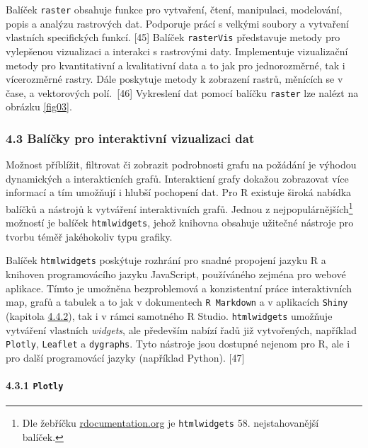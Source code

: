 \documentclass[12pt,]{article}
\let\oldparagraph\paragraph
\renewcommand{\paragraph}[1]{\oldparagraph{#1}\mbox{}}
\let\rmarkdownfootnote\footnote%
\def\footnote{\protect\rmarkdownfootnote}
\begin{document}
\qquad Balíček \texttt{raster} obsahuje funkce pro vytvaření, čtení,
manipulaci, modelování, popis a analýzu rastrových dat. Podporuje prácí
s velkými soubory a vytvaření vlastních specifických funkcí. {[}45{]}
Balíček \texttt{rasterVis} představuje metody pro vylepšenou vizualizaci
a interakci s rastrovými daty. Implementuje vizualizační metody pro
kvantitativní a kvalitativní data a to jak pro jednorozměrné, tak i
vícerozměrné rastry. Dále poskytuje metody k zobrazení rastrů, měnících
se v čase, a vektorových polí.~{[}46{]} Vykreslení dat pomocí balíčku
\texttt{raster} lze nalézt na obrázku \ref{fig03}.

\subsubsection{4.3 Balíčky pro interaktivní vizualizaci
dat}\label{balicky-pro-interaktivni-vizualizaci-dat}

\qquad Možnost příblížit, filtrovat či zobrazit podrobnosti grafu na
požádání je výhodou dynamických a interakticních grafů. Interakticní
grafy dokažou zobrazovat více informací a tím umožňují i hlubší
pochopení dat. Pro R existuje široká nabídka balíčků a nástrojů k
vytváření interaktivních grafů. Jednou z nejpopulárnějších\footnote{Dle
  žebříčku \href{https://www.rdocumentation.org/}{rdocumentation.org} je
  \texttt{htmlwidgets} 58. nejstahovanější balíček.} možností je balíček
\texttt{htmlwidgets}, jehož knihovna obsahuje užitečné nástroje pro
tvorbu téměř jakéhokoliv typu grafiky.

\qquad Balíček \texttt{htmlwidgets} poskýtuje rozhrání pro snadné
propojení jazyku R a knihoven programovácího jazyku JavaScript,
používáného zejména pro webové aplikace. Tímto je umožněna bezproblemová
a konzistentní práce interaktivních map, grafů a tabulek a to jak v
dokumentech \texttt{R\ Markdown} a v aplikacích \texttt{Shiny} (kapitola
\protect\hyperlink{shiny}{4.4.2}), tak i v rámci samotného R Studio.
\texttt{htmlwidgets} umožňuje vytváření vlastních \emph{widgets}, ale
především nabízí řadů již vytvořených, například \texttt{Plotly},
\texttt{Leaflet} a \texttt{dygraphs}. Tyto nástroje jsou dostupné
nejenom pro R, ale i pro další programovácí jazyky (například Python).
{[}47{]}

\paragraph{\texorpdfstring{4.3.1
\texttt{Plotly}}{4.3.1 Plotly}}\label{plotly}
\end{document}

